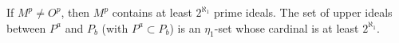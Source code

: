 If $M^p \neq O^p$, then $M^p$ contains at least $2^{\aleph_1}$ prime ideals. The set of upper ideals between $P^a$ and $P_b$ (with $P^a \subset P_b$) is an $\eta_1$-set whose cardinal is at least $2^{\aleph_1}$.

